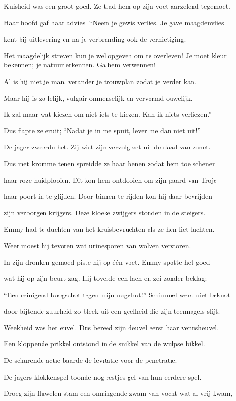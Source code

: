 Kuisheid was een groot goed.
Ze trad hem op zijn voet
aarzelend tegemoet.

Haar hoofd gaf haar advies;
“Neem je gewis verlies.
Je gave maagdenvlies

kent bij uitlevering
en na je verbranding
ook de vernietiging.

Het maagdelijk streven
kun je wel opgeven
om te overleven!
Je moet kleur bekennen;
je natuur erkennen.
Ga hem verwennen!

Al is hij niet je man,
verander je trouwplan
zodat je verder kan.

Maar hij is zo lelijk,
vulgair onmenselijk
en vervormd ouwelijk.

Ik zal maar wat kiezen
om niet iets te kiezen.
Kan ik niets verliezen.”

Dus flapte ze eruit;
“Nadat je in me spuit,
lever me dan niet uit!”

De jager zweerde het.
Zij wist zijn vervolg-zet
uit de daad van zonet.

Dus met kromme tenen
spreidde ze haar benen
zodat hem toe schenen

haar roze huidplooien.
Dit kon hem ontdooien
om zijn paard van Troje

haar poort in te glijden.
Door binnen te rijden
kon hij daar bevrijden

zijn verborgen krijgers.
Deze kloeke zwijgers
stonden in de steigers.

Emmy had te duchten
van het kruisbevruchten
als ze hen liet luchten.

Weer moest hij tevoren
wat urinesporen
van wolven verstoren.

In zijn dronken gemoed
piste hij op één voet.
Emmy spotte het goed

wat hij op zijn beurt zag.
Hij toverde een lach
en zei zonder beklag:

“Een reinigend boogschot
tegen mijn nagelrot!”
Schimmel werd niet beknot

door bijtende zuurheid
zo bleek uit een geelheid
die zijn teennagels slijt.

Weekheid was het euvel.
Dus bereed zijn deuvel
eerst haar venusheuvel.

Een kloppende prikkel
ontstond in de snikkel
van de wulpse bikkel.

De schurende actie
baarde de levitatie
voor de penetratie.

De jagers klokkenspel
toonde nog restjes gel
van hun eerdere spel.

Droeg zijn fluwelen stam
een omringende zwam
van vocht wat al vrij kwam,

